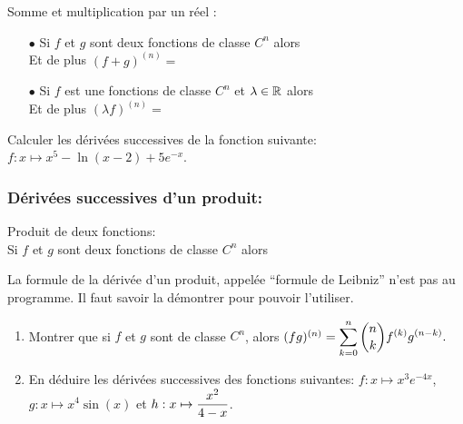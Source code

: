 \documentclass[a4paper, 11pt]{article}
\begin{document}
{\noindent

	\begin{prop} Somme et multiplication par un r\'eel :
		\begin{itemize}
			\item[$\bullet$] Si $f$ et $g$ sont deux fonctions de classe $C^n$ alors \dotfill \vsec\\
			      Et de plus $(f+g)^{(n)}=$\dotfill \vsec
			\item[$\bullet$] Si $f$ est une fonctions de classe $C^n$ et $\lambda\in\mathbb{R}$ alors \dotfill \vsec\\
			      Et de plus $(\lambda f)^{(n)}=$\dotfill \vsec
		\end{itemize}
	\end{prop}
}


{\footnotesize
	\begin{exercice}
		Calculer les d\'eriv\'ees successives de la fonction suivante: $f: x\mapsto x^5-\ln{(x-2)}+5e^{-x}$.
	\end{exercice}}\vsec\vsec

\subsubsection{D\'eriv\'ees successives d'un produit:}

{\noindent

	\begin{prop} Produit de deux fonctions:\\
		Si $f$ et $g$ sont deux fonctions de classe $C^n$ alors \dotfill \vsec
	\end{prop}
}

{\footnotesize
	\begin{exercice}
		La formule de la d\'eriv\'ee d'un produit, appel\'ee ``formule de Leibniz'' n'est pas au programme. Il faut savoir la d\'emontrer pour pouvoir l'utiliser.
		\begin{enumerate}
			\item Montrer que si $f$ et $g$ sont de classe $C^n$, alors $(fg)^{(n)} = \displaystyle \sum_{k=0}^n \binom{n}{k} f^{(k)} g^{(n-k)}.$
			\item En d\'eduire les d\'eriv\'ees successives des fonctions suivantes: $f: x\mapsto x^3e^{-4x}$, $g: x\mapsto x^4\sin{(x)}$ et $h: x\mapsto \displaystyle\frac{x^2}{4-x}$.
		\end{enumerate}
	\end{exercice}}\vsec\vsec
\end{document}
